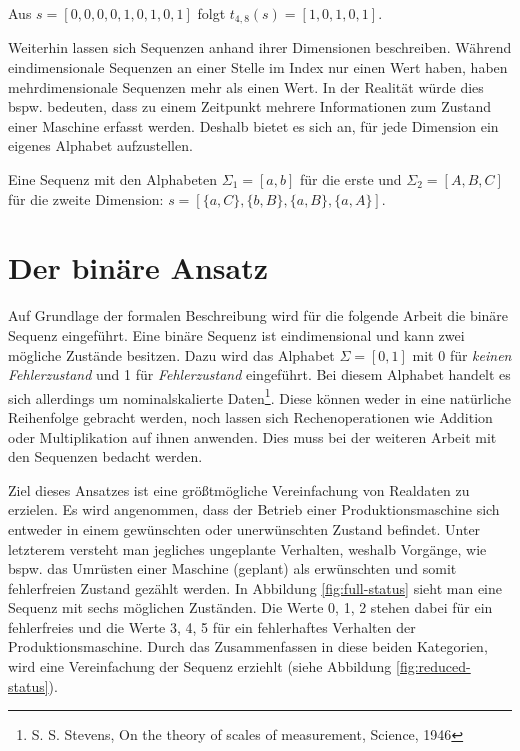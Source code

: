 \begin{theorem}
Aus $s = [0,0,0,0,1,0,1,0,1]$ folgt $t_{4,8}(s) = [1,0,1,0,1] $.
\end{theorem}

Weiterhin lassen sich Sequenzen anhand ihrer Dimensionen beschreiben. Während eindimensionale Sequenzen an einer Stelle im Index nur einen Wert haben, haben mehrdimensionale Sequenzen mehr als einen Wert. In der Realität würde dies bspw. bedeuten, dass zu einem Zeitpunkt mehrere Informationen zum Zustand einer Maschine erfasst werden. Deshalb bietet es sich an, für jede Dimension ein eigenes Alphabet aufzustellen.

\begin{theorem}
Eine Sequenz mit den Alphabeten $\Sigma_{1} = [a,b]$ für die erste und $\Sigma_{2} = [A,B,C]$ für die zweite Dimension: $s = [\{a,C\},\{b,B\},\{a,B\},\{a,A\}]$.
\end{theorem}

\section{Der binäre Ansatz}
Auf Grundlage der formalen Beschreibung wird für die folgende Arbeit die binäre Sequenz eingeführt. Eine binäre Sequenz ist eindimensional und kann zwei mögliche Zustände besitzen. Dazu wird das Alphabet $\Sigma = [0,1]$ mit 0 für \textit{keinen Fehlerzustand} und 1 für \textit{Fehlerzustand} eingeführt. Bei diesem Alphabet handelt es sich allerdings um nominalskalierte Daten\footnote{S. S. Stevens, On the theory of scales of measurement, Science, 1946}. Diese können weder in eine natürliche Reihenfolge gebracht werden, noch lassen sich Rechenoperationen wie Addition oder Multiplikation auf ihnen anwenden. Dies muss bei der weiteren Arbeit mit den Sequenzen bedacht werden.

Ziel dieses Ansatzes ist eine größtmögliche Vereinfachung von Realdaten zu erzielen. Es wird angenommen, dass der Betrieb einer Produktionsmaschine sich entweder in einem gewünschten oder unerwünschten Zustand befindet. Unter letzterem versteht man jegliches ungeplante Verhalten, weshalb Vorgänge, wie bspw. das Umrüsten einer Maschine (geplant) als erwünschten und somit fehlerfreien Zustand gezählt werden. In Abbildung \ref{fig:full-status} sieht man eine Sequenz mit sechs möglichen Zuständen. Die Werte 0, 1, 2 stehen dabei für ein fehlerfreies und die Werte 3, 4, 5 für ein fehlerhaftes Verhalten der Produktionsmaschine. Durch das Zusammenfassen in diese beiden Kategorien, wird eine Vereinfachung der Sequenz erziehlt (siehe Abbildung \ref{fig:reduced-status}).

